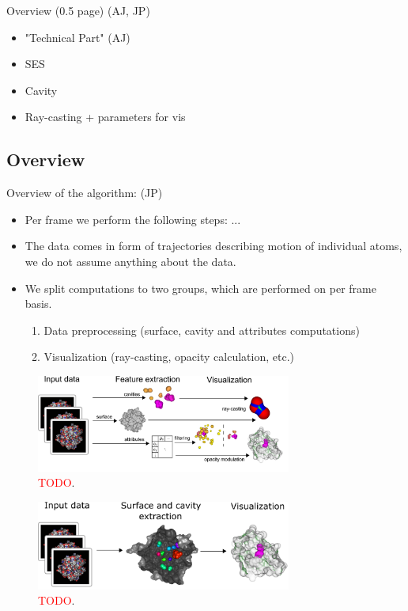 Overview (0.5 page) (AJ, JP)
\begin{itemize}
  \item "Technical Part" (AJ)
  \item SES
  \item Cavity
  \item Ray-casting + parameters for vis
\end{itemize}

\subsection{Overview}
Overview of the algorithm: (JP)
\begin{itemize}
  \item Per frame we perform the following steps: ...
  \item The data comes in form of trajectories describing motion of individual atoms, we do not assume anything about the data.
  \item We split computations to two groups, which are performed on per frame basis.
	\begin{enumerate}
	  \item Data preprocessing (surface, cavity and attributes computations)
		\item Visualization  (ray-casting, opacity calculation, etc.)
	\end{enumerate}
\end{itemize}

\begin{figure}[htb]
  \centering
  \includegraphics[width=3.3in]{image/overview.png}
  \caption{\textcolor{red}{TODO}.}
	\label{fig:overview}
\end{figure}

\begin{figure}[htb]
  \centering
  \includegraphics[width=3.3in]{image/overview2.png}
  \caption{\textcolor{red}{TODO}.}
	\label{fig:overview2}
\end{figure}

